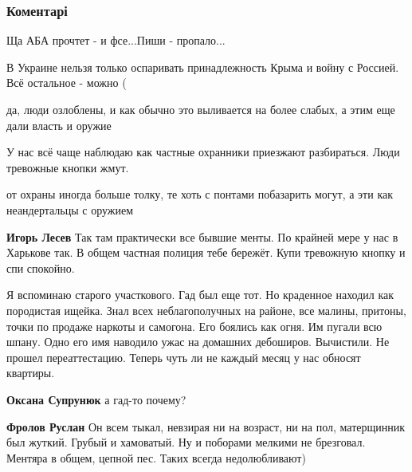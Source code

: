 
 
 
 
 
\subsubsection{Коментарі}

\begin{itemize} %
Ща АБА прочтет - и фсе...Пиши - пропало...

В Украине нельзя только оспаривать принадлежность Крыма и войну с Россией. Всё остальное - можно (

да, люди озлоблены, и как обычно это выливается на более слабых, а этим еще дали власть и оружие

У нас всё чаще наблюдаю как частные охранники приезжают разбираться. Люди тревожные кнопки жмут.

\begin{itemize} %
от охраны иногда больше толку, те хоть с понтами побазарить могут, а эти как неандертальцы с оружием

\textbf{Игорь Лесев} Так там практически все бывшие менты. По крайней мере у нас в Харькове так. В общем частная полиция тебе бережёт. Купи тревожную кнопку и спи спокойно.
\end{itemize} %


Я вспоминаю старого участкового. Гад был еще тот. Но краденное находил как
породистая ищейка. Знал всех неблагополучных на районе, все малины,
притоны, точки по продаже наркоты и самогона. Его боялись как огня. Им пугали
всю шпану. Одно его имя наводило ужас на домашних дебоширов. Вычистили. Не
прошел переаттестацию. Теперь чуть ли не каждый месяц у нас обносят квартиры.

\begin{itemize} %
\textbf{Оксана Супрунюк} а гад-то почему?

\textbf{Фролов Руслан} Он всем тыкал, невзирая ни на возраст, ни на пол, матерщинник был жуткий. Грубый и хамоватый. Ну и поборами мелкими не брезговал. Ментяра в общем, цепной пес. Таких всегда недолюбливают)


\end{itemize}
\end{itemize}
